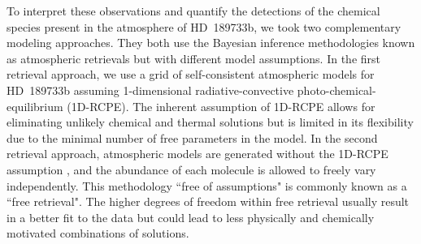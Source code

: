 \documentclass[sn-standardnature]{sn-jnl}%
\begin{document}
To interpret these observations and quantify the detections of the chemical species present in the atmosphere of HD~189733b, we took two complementary modeling approaches. They both use the Bayesian inference methodologies known as atmospheric retrievals \cite{madhusudhan_atmospheric_2018} but with different model assumptions. In the first retrieval approach, we use a grid of self-consistent atmospheric models for HD~189733b assuming 1-dimensional radiative-convective photo-chemical-equilibrium (1D-RCPE). The inherent assumption of 1D-RCPE allows for eliminating unlikely chemical and thermal solutions but is limited in its flexibility due to the minimal number of free parameters in the model. In the second retrieval approach, atmospheric models are generated without the 1D-RCPE assumption \cite{line_systematic_2013}, and the abundance of each molecule is allowed to freely vary independently. This methodology ``free of assumptions" is commonly known as a ``free retrieval". The higher degrees of freedom within free retrieval usually result in a better fit to the data but could lead to less physically and chemically motivated combinations of solutions. 


\end{document}

